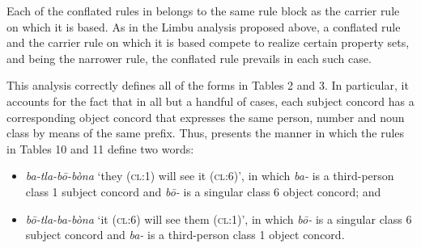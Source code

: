 \documentclass[output=paper,
modfonts
]{LSP/langsci}
\begin{document}
Each of the conflated rules in  belongs to the same rule block as the carrier rule on which it is based.  As in the Limbu analysis proposed above, a conflated rule and the carrier rule on which it is based compete to realize certain  property sets, and being the narrower rule, the conflated rule prevails in each such case.   

  This analysis correctly defines all of the forms in Tables 2 and 3.  In particular, it accounts for the fact that in all but a handful of cases, each subject concord has a corresponding object concord that expresses the same person, number and noun class by means of the same prefix.  Thus,  presents the manner in which the rules in Tables 10 and 11 define two words:  

\begin{itemize}
\item 
\textit{ba\nobreakdash-tla\nobreakdash-b\=o\nobreakdash-bòna}  ‘they (\textsc{cl}:1) will see it (\textsc{cl}:6)’, in which \textit{ba\nobreakdash-} is a third\nobreakdash-person  class 1 subject concord and \textit{b\=o\nobreakdash-} is a singular class 6 object concord; and
\item
\textit{b\=o\nobreakdash-tla\nobreakdash-ba\nobreakdash-bòna}  ‘it (\textsc{cl}:6) will see them (\textsc{cl}:1)’, in which \textit{b}\textit{\=o}\textit{\nobreakdash-} is a singular class 6 subject concord and \textit{ba\nobreakdash-} is a third\nobreakdash-person  class 1 object concord. 
\end{itemize}
\end{document}
